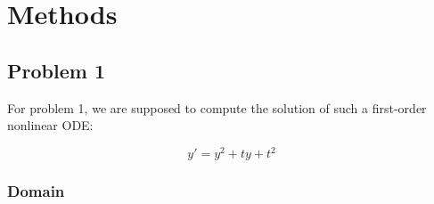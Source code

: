 \documentclass[a4paper]{article}
\begin{document}
	
	
	
	
	
	
	
	
	\section{Methods}
	
	\subsection{Problem 1}
	
	For problem 1, we are supposed to compute the solution of such a first-order nonlinear ODE: 
	
	\begin{equation} \label{eq:ode1}
		y' = y^2 + ty + t^2 \tag{ODE1}
	\end{equation}
	
	\subsubsection{Domain}
	
\end{document}
